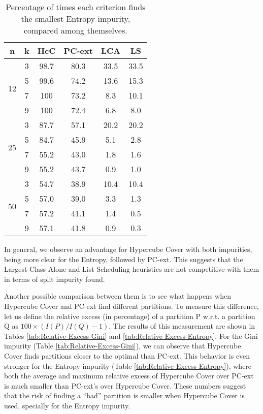 \begin{table}
\centering
\begin{tabular}{c|c|c|c|c|c} 
        n            &    k        &   HcC   &   PC-ext   &   LCA   &   LS   \\
\hline
\multirow{4}{*}{12}  &    3        &   98.7  & 80.3       & 33.5    & 33.5   \\
                     &    5        &   99.6  & 74.2       & 13.6    & 15.3   \\
                     &    7        &   100   & 73.2       & 8.3     & 10.1   \\
                     &    9        &   100   & 72.4       & 6.8     & 8.0    \\
\hline
\multirow{4}{*}{25}  &    3        &   87.7  & 57.1       & 20.2    & 20.2   \\
                     &    5        &   84.7  & 45.9       & 5.1     & 2.8    \\
                     &    7        &   55.2  & 43.0       & 1.8     & 1.6    \\
                     &    9        &   55.2  & 43.7       & 0.9     & 1.0    \\
\hline
\multirow{4}{*}{50}  &    3        &   54.7  & 38.9       & 10.4    & 10.4   \\
                     &    5        &   57.0  & 39.0       & 3.3     & 1.3    \\
                     &    7        &   57.2  & 41.1       & 1.4     & 0.5    \\
                     &    9        &   57.1  & 41.8       & 0.9     & 0.3
\end{tabular}
\caption{Percentage of times each criterion finds the smallest Entropy impurity, compared among themselves.}
\label{tab:Splits-Entropy}
\end{table}


In general, we observe an advantage for Hypercube Cover with both impurities, being more clear for the Entropy, followed by PC-ext. This suggests that the Largest Class Alone and List Scheduling heuristics are not competitive with them in terms of split impurity found.

Another possible comparison between them is to see what happens when Hypercube Cover and PC-ext find different partitions. To measure this difference, let us define the relative excess (in percentage) of a partition P w.r.t. a partition Q as $100 \times (I(P)/I(Q) - 1)$. The results of this measurement are shown in Tables \ref{tab:Relative-Excess-Gini} and \ref{tab:Relative-Excess-Entropy}. For the Gini impurity (Table \ref{tab:Relative-Excess-Gini}), we can observe that Hypercube Cover finds partitions closer to the optimal than PC-ext. This behavior is even stronger for the Entropy impurity (Table \ref{tab:Relative-Excess-Entropy}), where both the average and maximum relative excess of Hypercube Cover over PC-ext is much smaller than PC-ext's over Hypercube Cover. These numbers suggest that the risk of finding a ``bad'' partition is smaller when Hypercube Cover is used, specially for the Entropy impurity.

